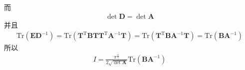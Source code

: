         而
        \begin{equation}\begin{aligned}
            \det{\bm{D}} = \det{\bm{A}}
        \end{aligned}\end{equation}
        并且
        \begin{equation}\begin{aligned}
            \mathrm{Tr}(\bm{ED}^{-1}) = \mathrm{Tr}(\bm{T}^\mathrm{T}\bm{BT}\bm{T}^\mathrm{T} \bm{A}^{-1}\bm{T})
            = \mathrm{Tr}(\bm{T}^\mathrm{T}\bm{BA}^{-1}\bm{T})
            = \mathrm{Tr}(\bm{BA}^{-1})
        \end{aligned}\end{equation}
        所以
        \begin{equation}\begin{aligned}
            I = \frac {\pi^{\frac n2}}{2\sqrt{\det{\bm{A}}}} \mathrm{Tr} (\bm{BA}^{-1})
        \end{aligned}\end{equation}

